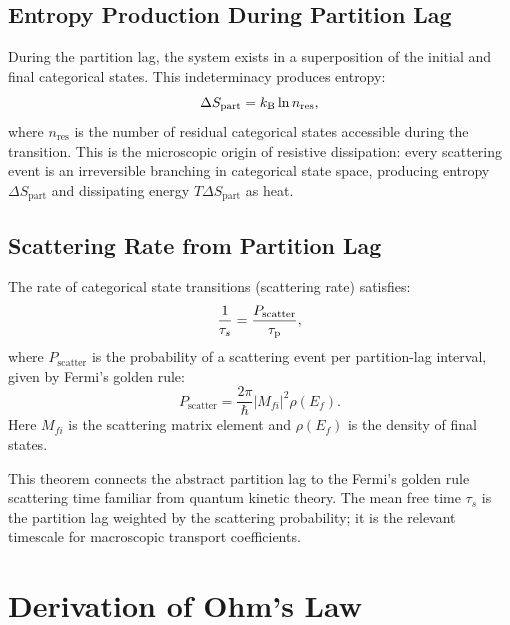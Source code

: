 \subsection{Entropy Production During Partition Lag}

During the partition lag, the system exists in a superposition of the
initial and final categorical states.  This indeterminacy produces entropy:
\begin{equation}
  \Delta S_{\mathrm{part}} = k_{\mathrm{B}} \ln n_{\mathrm{res}},
  \label{eq:ch18-spartition}
\end{equation}
where $n_{\mathrm{res}}$ is the number of residual categorical states
accessible during the transition.  This is the microscopic origin of
resistive dissipation: every scattering event is an irreversible branching
in categorical state space, producing entropy $\Delta S_{\mathrm{part}}$
and dissipating energy $T\Delta S_{\mathrm{part}}$ as heat.

\subsection{Scattering Rate from Partition Lag}

\begin{theorem}
\label{thm:ch18-scatter}
The rate of categorical state transitions (scattering rate) satisfies:
\begin{equation}
  \frac{1}{\tau_s} = \frac{P_{\mathrm{scatter}}}{\tau_{\mathrm{p}}},
  \label{eq:ch18-scatterrate}
\end{equation}
where $P_{\mathrm{scatter}}$ is the probability of a scattering event per
partition-lag interval, given by Fermi's golden rule:
\begin{equation}
  P_{\mathrm{scatter}} = \frac{2\pi}{\hbar}\lvert M_{fi}\rvert^2
    \rho(E_f).
  \label{eq:ch18-fermi}
\end{equation}
Here $M_{fi}$ is the scattering matrix element and $\rho(E_f)$ is the
density of final states.
\end{theorem}

This theorem connects the abstract partition lag to the Fermi's golden rule
scattering time familiar from quantum kinetic theory.  The mean free time
$\tau_s$ is the partition lag weighted by the scattering probability; it is
the relevant timescale for macroscopic transport coefficients.

\section{Derivation of Ohm's Law}
\label{sec:ch18-ohm}

